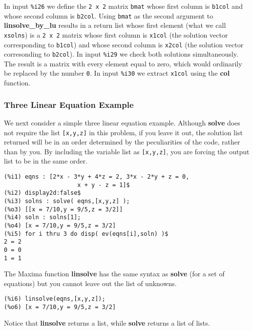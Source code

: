 \documentclass[12pt]{article}
\begin{document}
\normalsize
In input \verb|%i26| we define the \verb|2 x 2| matrix \verb|bmat| whose first column
  is \verb|b1col| and whose second column is \verb|b2col|.
Using \verb|bmat| as the second argument to \textbf{linsolve\_by\_lu} results in
  a return list whose first element (what we call \verb|xsolns|) is a \verb|2 x 2|
  matrix whose first column is \verb|x1col| (the solution vector corresponding to
  \verb|b1col|) and whose second column is \verb|x2col| (the solution vector
  corresonding to \verb|b2col|).
In input \verb|%i29| we check both solutions simultaneously.
The result is a matrix with every element equal to zero, which would ordinarily
  be replaced by the number \verb|0|.
In input \verb|%i30| we extract \verb|x1col| using the \textbf{col} function.\\

\subsubsection{Three Linear Equation Example }  
We next consider a simple three linear equation example.
Although \textbf{solve} does not require the list \verb|[x,y,z]| in this
  problem, if you leave it out, the solution list returned will be in an
  order determined by the peculiarities of the code, rather than by you.
By including the variable list as \verb|[x,y,z]|, you are forcing the 
  output list to be in the same order.
\small
\begin{verbatim}
(%i1) eqns : [2*x - 3*y + 4*z = 2, 3*x - 2*y + z = 0,
                     x + y - z = 1]$
(%i2) display2d:false$
(%i3) solns : solve( eqns,[x,y,z] );
(%o3) [[x = 7/10,y = 9/5,z = 3/2]]
(%i4) soln : solns[1];
(%o4) [x = 7/10,y = 9/5,z = 3/2]
(%i5) for i thru 3 do disp( ev(eqns[i],soln) )$
2 = 2
0 = 0
1 = 1
\end{verbatim}
\normalsize
The Maxima function \textbf{linsolve} has the same syntax as \textbf{solve} (for
  a set of equations) but you cannot leave out the list of unknowns.
\small
\begin{verbatim}
(%i6) linsolve(eqns,[x,y,z]);
(%o6) [x = 7/10,y = 9/5,z = 3/2]
\end{verbatim}
\normalsize
Notice that \textbf{linsolve} returns a list, while \textbf{solve} returns a
  list of lists.

  \smallskip

\newpage
\end{document}
